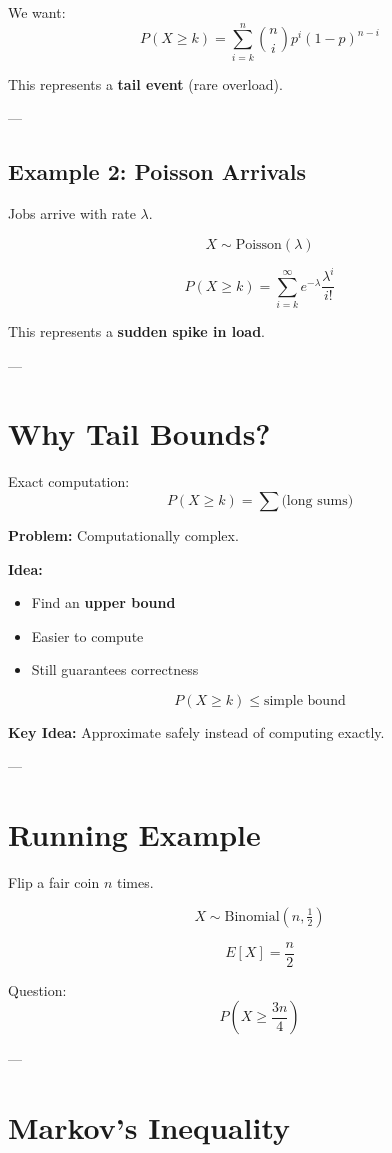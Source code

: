\documentclass[12pt]{article}
\begin{document}
We want:
\[
P(X \ge k) = \sum_{i=k}^{n} \binom{n}{i} p^i (1-p)^{n-i}
\]

This represents a \textbf{tail event} (rare overload).

---

\subsection{Example 2: Poisson Arrivals}

Jobs arrive with rate $\lambda$.

\[
X \sim \text{Poisson}(\lambda)
\]

\[
P(X \ge k) = \sum_{i=k}^{\infty} e^{-\lambda} \frac{\lambda^i}{i!}
\]

This represents a \textbf{sudden spike in load}.

---

\section{Why Tail Bounds?}

Exact computation:
\[
P(X \ge k) = \sum \text{(long sums)}
\]

\textbf{Problem:} Computationally complex.

\textbf{Idea:}
\begin{itemize}
    \item Find an \textbf{upper bound}
    \item Easier to compute
    \item Still guarantees correctness
\end{itemize}

\[
P(X \ge k) \le \text{simple bound}
\]

\textbf{Key Idea:} Approximate safely instead of computing exactly.

---

\section{Running Example}

Flip a fair coin $n$ times.

\[
X \sim \text{Binomial}(n, \tfrac{1}{2})
\]

\[
E[X] = \frac{n}{2}
\]

Question:
\[
P\left(X \ge \frac{3n}{4}\right)
\]

---

\section{Markov's Inequality}
\end{document}
